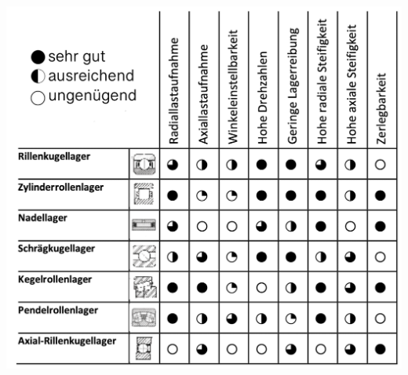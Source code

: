 \begin{center}
    \includegraphics[width = 0.9\linewidth]{src/images/MAEIP_Lagerungen}
\end{center}
